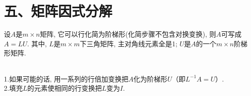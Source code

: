 \section{五、矩阵因式分解}
设$A$是$m\times n$矩阵, 它可以行化简为阶梯形(化简步骤不包含对换变换), 则$A$可写成$A=LU$. 其中, $L$是$m\times m$下三角矩阵, 主对角线元素全是1; $U$是$A$的一个$m\times n$阶梯形矩阵.\\[2ex]

\begin{law}[$LU$分解的算法]\ \\
1.如果可能的话, 用一系列的行倍加变换把$A$化为阶梯形$U$（即$L^{-1}A=U$）.\\
2.填充$L$的元素使相同的行变换把$L$变为$I$.
\end{law}\vspace{4ex}

